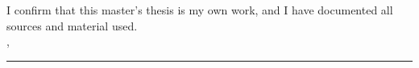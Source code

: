 \chapter{}%
I confirm that this master's thesis is my own work, and I have documented all sources and material used.
\\[6ex]

\city, \submissionDate

\vspace{1.5cm}
\rule[-0.2cm]{5cm}{0.5pt}

\textsc{\authorname} 
